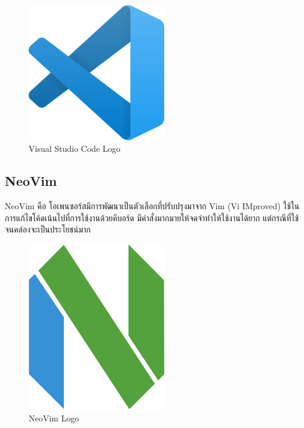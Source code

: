 \begin{figure}[H]
    \centering
    \includegraphics[width=60mm,scale=1.0]{images/vscode.png}
    \caption{Visual Studio Code Logo}
    \label{fig:vscode}
\end{figure}

\subsection{NeoVim}

NeoVim คือ โอเพนซอร์สมีการพัฒนาเป็นตัวเลือกที่ปรับปรุงมาจาก Vim (Vi IMproved) ใช้ในการแก้ไขโค้ดเน้นไปที่การใช้งานด้วยคีบอร์ด มีคำสั่งมากมายให้จดจำทำให้ใช้งานได้ยาก แต่กรณีที่ใช้จนคล่องจะเป็นประโยชน์มาก

\begin{figure}[H]
    \centering
    \includegraphics[width=60mm,scale=1.0]{images/neovim.png}
    \caption{NeoVim Logo}
    \label{fig:neovim}
\end{figure}

\newpage


